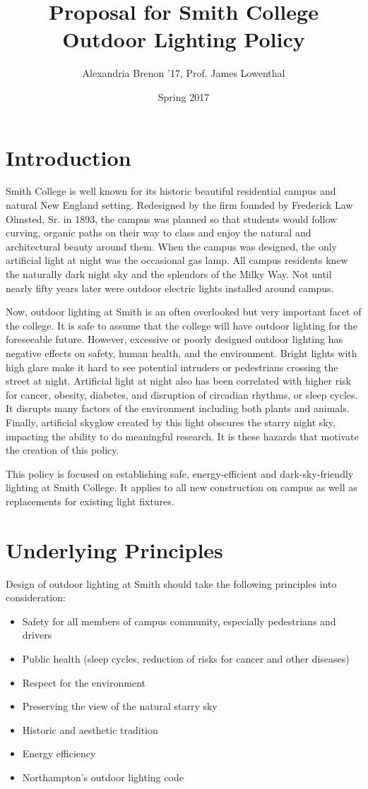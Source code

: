 \documentclass[12pt, oneside]{article}
\title{Proposal for Smith College Outdoor Lighting Policy}
\author{Alexandria Brenon '17, Prof. James Lowenthal}
\date{Spring 2017}
\begin{document}
\maketitle
\tableofcontents
\listoffigures
\listoftables
\newpage
\doublespacing


\section{Introduction}
Smith College is well known for its historic beautiful residential campus and natural New England setting. 
Redesigned by the firm founded by Frederick Law Olmsted, Sr. in 1893, the campus was planned so that students would follow curving, organic paths on their way to class and enjoy the natural and architectural beauty around them. When the campus was designed, the only artificial light at night was the occasional gas lamp. All campus residents knew the naturally dark night sky and the splendors of the Milky Way. Not until nearly fifty years later were outdoor electric lights installed around campus. 

Now, outdoor lighting at Smith is an often overlooked but very important facet of the college.
It is safe to assume that the college will have outdoor lighting for the foreseeable future. However, excessive or poorly designed outdoor lighting has negative effects on safety, human health, and the environment. Bright lights with high glare make it hard to see potential intruders or pedestrians crossing the street at night. Artificial light at night also has been correlated with higher risk for cancer, obesity, diabetes, and disruption of circadian rhythms, or sleep cycles. It disrupts many factors of the environment including both plants and animals. Finally, artificial skyglow created by this light obscures the starry night sky, impacting the ability to do meaningful research. 
It is these hazards that motivate the creation of this policy. 

This policy is focused on establishing safe, energy-efficient and dark-sky-friendly lighting at Smith College. It applies to all new construction on campus as well as replacements for existing light fixtures.

\section{Underlying Principles}

Design of outdoor lighting at Smith should take the following principles into consideration:
\begin{itemize}
\item Safety for all members of campus community, especially pedestrians and drivers
\item Public health (sleep cycles, reduction of risks for cancer and other diseases) 
\item Respect for the environment
\item Preserving the view of the natural starry sky
\item Historic and aesthetic tradition
\item Energy efficiency 
\item Northampton's outdoor lighting code
\end{itemize}
\end{document}
